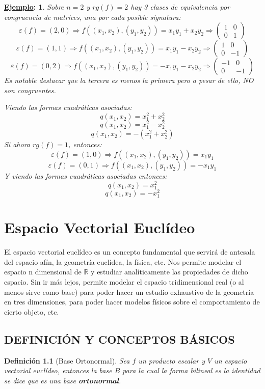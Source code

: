 \documentclass[10pt,a4paper,openright]{book}
\theoremstyle{break}
\newtheorem*{defi}{Definición}
\newtheorem*{ej}{\underline{Ejemplo}:}
\begin{document}
\begin{ej}
Sobre $n= 2$ y $rg(f)=2$ hay 3 clases de equivalencia por congruencia de matrices, una por cada posible signatura:
$$\varepsilon(f)=(2,0)\Rightarrow f((x_1,x_2),(y_1,y_2)) = x_1y_1+x_2y_2 \Rightarrow \begin{pmatrix} 1 & 0 \\ 0 & 1\end{pmatrix}$$
$$\varepsilon(f)=(1,1)\Rightarrow f((x_1,x_2),(y_1,y_2)) = x_1y_1-x_2y_2 \Rightarrow \begin{pmatrix} 1 & 0 \\ 0 & -1\end{pmatrix}$$
$$\varepsilon(f)=(0,2)\Rightarrow f((x_1,x_2),(y_1,y_2)) = -x_1y_1-x_2y_2 \Rightarrow \begin{pmatrix} -1 & 0 \\ 0 & -1\end{pmatrix}$$
Es notable destacar que la tercera es menos la primera pero a pesar de ello, NO son congruentes.

Viendo las formas cuadráticas asociadas:
$$q(x_1,x_2) = x_1^2+x_2^2$$
$$q(x_1,x_2) = x_1^2-x_2^2$$
$$q(x_1,x_2) = -(x_1^2+x_2^2)$$
Si ahora $rg(f)=1$, entonces:
$$\varepsilon(f)=(1,0)\Rightarrow f((x_1,x_2),(y_1,y_2)) = x_1y_1$$
$$\varepsilon(f)=(0,1)\Rightarrow f((x_1,x_2),(y_1,y_2)) = -x_1y_1$$
Y viendo las formas cuadráticas asociadas entonces:
$$q(x_1,x_2) = x_1^2$$
$$q(x_1,x_2) = -x_1^2$$
\end{ej}



\chapter{Espacio Vectorial Euclídeo}
El espacio vectorial euclídeo es un concepto fundamental que servirá de antesala del espacio afín, la geometría euclídea, la física, etc. Nos permite modelar el espacio n dimensional de $\mathbb{R}$ y estudiar analíticamente las propiedades de dicho espacio. Sin ir más lejos, permite modelar el espacio tridimensional real (o al menos sirve como base) para poder hacer un estudio exhaustivo de la geometría en tres dimensiones, para poder hacer modelos físicos sobre el comportamiento de cierto objeto, etc.

\section{DEFINICIÓN Y CONCEPTOS BÁSICOS}
\begin{defi}[Base Ortonormal]
Sea $f$ un producto escalar y $V$ un espacio vectorial euclídeo, entonces la base $B$ para la cual la forma bilineal es la identidad se dice que es una base \textbf{ortonormal}.
\end{defi}
\end{document}
